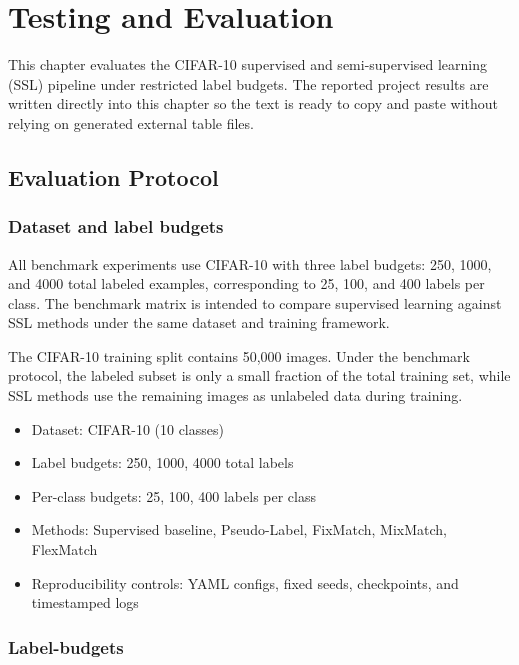 \chapter{Testing and Evaluation}
\label{chap:eval}

This chapter evaluates the CIFAR-10 supervised and semi-supervised learning (SSL) pipeline under restricted label budgets. The reported project results are written directly into this chapter so the text is ready to copy and paste without relying on generated external table files.

\section{Evaluation Protocol}

\subsection{Dataset and label budgets}

All benchmark experiments use CIFAR-10 with three label budgets: 250, 1000, and 4000 total labeled examples, corresponding to 25, 100, and 400 labels per class. The benchmark matrix is intended to compare supervised learning against SSL methods under the same dataset and training framework.

The CIFAR-10 training split contains 50,000 images. Under the benchmark protocol, the labeled subset is only a small fraction of the total training set, while SSL methods use the remaining images as unlabeled data during training.

\begin{itemize}
    \item Dataset: CIFAR-10 (10 classes)
    \item Label budgets: 250, 1000, 4000 total labels
    \item Per-class budgets: 25, 100, 400 labels per class
    \item Methods: Supervised baseline, Pseudo-Label, FixMatch, MixMatch, FlexMatch
    \item Reproducibility controls: YAML configs, fixed seeds, checkpoints, and timestamped logs
\end{itemize}

\subsection{Label-budgets}

